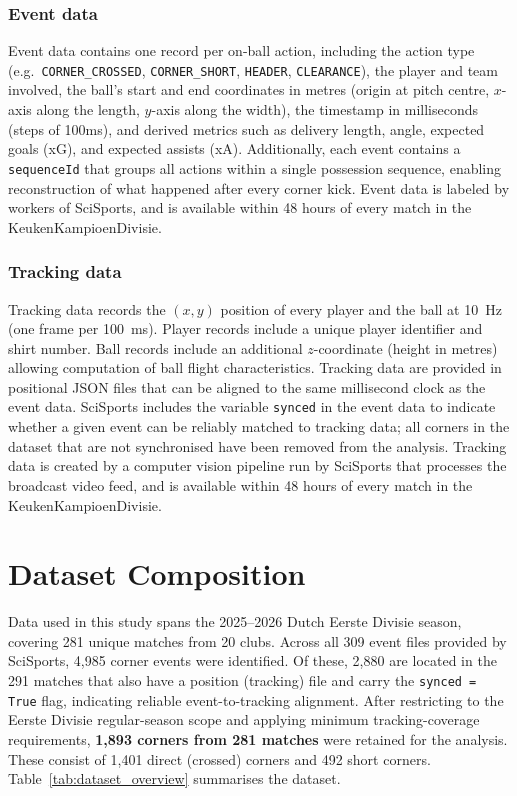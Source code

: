 \subsubsection{Event data}
Event data contains one record per on-ball action, including the action type
(e.g.\ \texttt{CORNER\_CROSSED}, \texttt{CORNER\_SHORT}, \texttt{HEADER},
\texttt{CLEARANCE}), the player and team involved, the ball's start and end
coordinates in metres (origin at pitch centre, $x$-axis along the length,
$y$-axis along the width), the timestamp in milliseconds (steps of 100ms), and derived metrics
such as delivery length, angle, expected goals (xG), and expected assists (xA).
Additionally, each event contains a \texttt{sequenceId} that groups all actions
within a single possession sequence, enabling reconstruction of what happened
after every corner kick. Event data is labeled by workers of SciSports, and is available within 
48 hours of every match in the KeukenKampioenDivisie.

\subsubsection{Tracking data}
Tracking data records the $(x, y)$ position of every player and the ball at
10~Hz (one frame per 100~ms). Player records include a unique player identifier
and shirt number. Ball records include an additional $z$-coordinate (height in
metres) allowing computation of ball flight characteristics.
Tracking data are provided in positional JSON files that can be aligned to the same
millisecond clock as the event data. SciSports includes the variable \texttt{synced} in the
event data to indicate whether a given event can be reliably matched to tracking data; 
all corners in the dataset that are not synchronised have been removed from the analysis. Tracking data
is created by a computer vision pipeline run by SciSports that processes the broadcast 
video feed, and is available within 48 hours of every match in the KeukenKampioenDivisie.

\section{Dataset Composition}
\label{sec:dataset_composition}

Data used in this study spans the 2025–2026 Dutch Eerste Divisie season, covering 281 unique matches
from 20 clubs. Across all 309 event files provided by SciSports, 4{,}985 corner events were identified.
Of these, 2{,}880 are located in the 291 matches that also have a position (tracking) file and carry
the \texttt{synced\,=\,True} flag, indicating reliable event-to-tracking alignment. After restricting
to the Eerste Divisie regular-season scope and applying minimum tracking-coverage requirements,
\textbf{1{,}893 corners from 281 matches} were retained for the analysis.
These consist of 1{,}401 direct (crossed) corners and 492 short corners.
Table~\ref{tab:dataset_overview} summarises the dataset.

